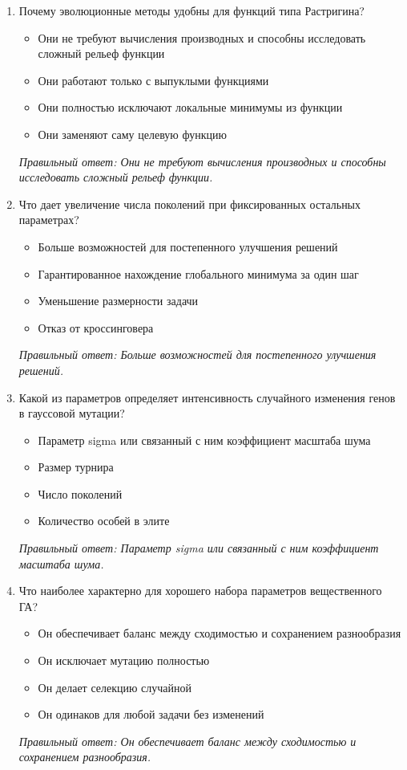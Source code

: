 \begin{enumerate}[label=\textbf{\arabic*.}, leftmargin=0pt, itemsep=1.2em]
\item Почему эволюционные методы удобны для функций типа Растригина?
\begin{itemize}[label=$\square$, leftmargin=1.5cm, itemsep=0.2em, topsep=0.3em]
\item Они не требуют вычисления производных и способны исследовать сложный рельеф функции
\item Они работают только с выпуклыми функциями
\item Они полностью исключают локальные минимумы из функции
\item Они заменяют саму целевую функцию
\end{itemize}
{\small\textit{Правильный ответ: Они не требуют вычисления производных и способны исследовать сложный рельеф функции.}}

\item Что дает увеличение числа поколений при фиксированных остальных параметрах?
\begin{itemize}[label=$\square$, leftmargin=1.5cm, itemsep=0.2em, topsep=0.3em]
\item Больше возможностей для постепенного улучшения решений
\item Гарантированное нахождение глобального минимума за один шаг
\item Уменьшение размерности задачи
\item Отказ от кроссинговера
\end{itemize}
{\small\textit{Правильный ответ: Больше возможностей для постепенного улучшения решений.}}

\item Какой из параметров определяет интенсивность случайного изменения генов в гауссовой мутации?
\begin{itemize}[label=$\square$, leftmargin=1.5cm, itemsep=0.2em, topsep=0.3em]
\item Параметр sigma или связанный с ним коэффициент масштаба шума
\item Размер турнира
\item Число поколений
\item Количество особей в элите
\end{itemize}
{\small\textit{Правильный ответ: Параметр sigma или связанный с ним коэффициент масштаба шума.}}

\item Что наиболее характерно для хорошего набора параметров вещественного ГА?
\begin{itemize}[label=$\square$, leftmargin=1.5cm, itemsep=0.2em, topsep=0.3em]
\item Он обеспечивает баланс между сходимостью и сохранением разнообразия
\item Он исключает мутацию полностью
\item Он делает селекцию случайной
\item Он одинаков для любой задачи без изменений
\end{itemize}
{\small\textit{Правильный ответ: Он обеспечивает баланс между сходимостью и сохранением разнообразия.}}


\end{enumerate}
